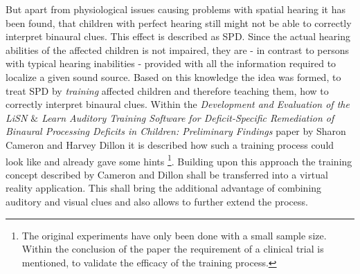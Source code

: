 \documentclass[a4paper,11pt]{article}%
\renewcommand{\\}{\vspace*{0.5\baselineskip} \newline}
\begin{document}
\newline
\newline
But apart from physiological issues causing problems with spatial hearing it has been found, that children with perfect hearing still might not be able to correctly interpret binaural clues. This effect is described as \ac{SPD}. Since the actual hearing abilities of the affected children is not impaired, they are - in contrast to persons with typical hearing inabilities - provided with all the information required to localize a given sound source. Based on this knowledge the idea was formed, to treat SPD by \textit{training} affected children and therefore teaching them, how to correctly interpret binaural clues.
\newline
\newline
Within the \textit{Development and Evaluation of the LiSN $\&$ Learn Auditory Training Software for Deficit-Specific Remediation of Binaural Processing Deficits in Children: Preliminary Findings} \cite{LISN-A} paper by Sharon Cameron and Harvey Dillon it is described how such a training process could look like and already gave some hints \footnote{The original experiments have only been done with a small sample size. Within the conclusion of the paper the requirement of a clinical trial is mentioned, to validate the efficacy of the training process.}.
\newline
\newline
Building upon this approach the training concept described by Cameron and Dillon shall be transferred into a virtual reality application. This shall bring the additional advantage of combining auditory and visual clues and also allows to further extend the process. 
\end{document}
